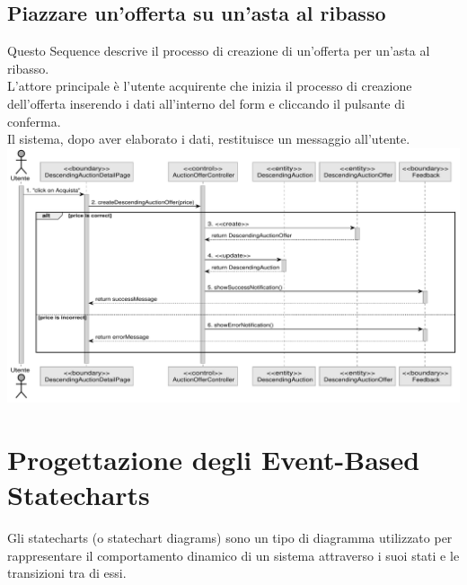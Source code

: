 \subsection{Piazzare un'offerta su un'asta al ribasso}
Questo Sequence descrive il processo di creazione di un'offerta per un'asta al ribasso.\\
L'attore principale è l'utente acquirente che inizia il processo di creazione dell'offerta inserendo i dati all'interno del form e cliccando il pulsante di conferma.\\
Il sistema, dopo aver elaborato i dati, restituisce un messaggio all'utente.\bskip
\includegraphics[width=\textwidth]{assets/sequence/piazzare_offerta_a_ribasso.pdf}
\newpage

\section{Progettazione degli Event-Based Statecharts}
Gli statecharts (o statechart diagrams) sono un tipo di diagramma utilizzato
per rappresentare il comportamento dinamico di un sistema attraverso
i suoi stati e le transizioni tra di essi.
